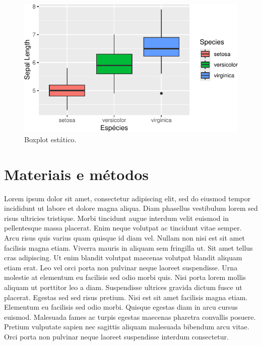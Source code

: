 \documentclass[
  a4paper,
]{report}
\begin{document}
\begin{figure}

{\centering \includegraphics{relatorio_pdf_files/figure-pdf/unnamed-chunk-3-1.pdf}

}

\caption{Boxplot estático.}

\end{figure}

\hypertarget{materiais-e-muxe9todos}{%
\chapter{Materiais e métodos}\label{materiais-e-muxe9todos}}

Lorem ipsum dolor sit amet, consectetur adipiscing elit, sed do eiusmod
tempor incididunt ut labore et dolore magna aliqua. Diam phasellus
vestibulum lorem sed risus ultricies tristique. Morbi tincidunt augue
interdum velit euismod in pellentesque massa placerat. Enim neque
volutpat ac tincidunt vitae semper. Arcu risus quis varius quam quisque
id diam vel. Nullam non nisi est sit amet facilisis magna etiam. Viverra
mauris in aliquam sem fringilla ut. Sit amet tellus cras adipiscing. Ut
enim blandit volutpat maecenas volutpat blandit aliquam etiam erat. Leo
vel orci porta non pulvinar neque laoreet suspendisse. Urna molestie at
elementum eu facilisis sed odio morbi quis. Nisi porta lorem mollis
aliquam ut porttitor leo a diam. Suspendisse ultrices gravida dictum
fusce ut placerat. Egestas sed sed risus pretium. Nisi est sit amet
facilisis magna etiam. Elementum eu facilisis sed odio morbi. Quisque
egestas diam in arcu cursus euismod. Malesuada fames ac turpis egestas
maecenas pharetra convallis posuere. Pretium vulputate sapien nec
sagittis aliquam malesuada bibendum arcu vitae. Orci porta non pulvinar
neque laoreet suspendisse interdum consectetur.
\end{document}
